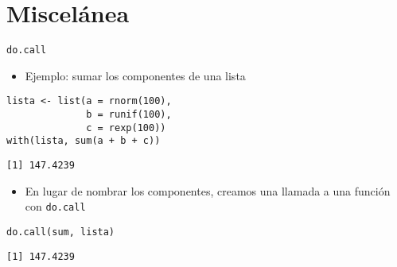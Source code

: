 \documentclass[xcolor={usenames,svgnames,dvipsnames}]{beamer}
\begin{document}
\section{Miscelánea}
\label{sec:orgheadline35}
\begin{frame}[fragile,label={sec:orgheadline30}]{\texttt{do.call}}
 \begin{itemize}
\item Ejemplo: sumar los componentes de una lista
\end{itemize}
\lstset{language=R,label= ,caption= ,captionpos=b,numbers=none}
\begin{lstlisting}
lista <- list(a = rnorm(100),
              b = runif(100),
              c = rexp(100))
with(lista, sum(a + b + c))
\end{lstlisting}

\begin{verbatim}
[1] 147.4239
\end{verbatim}

\begin{itemize}
\item En lugar de nombrar los componentes, creamos una llamada a una
función con \texttt{do.call}
\end{itemize}
\lstset{language=R,label= ,caption= ,captionpos=b,numbers=none}
\begin{lstlisting}
do.call(sum, lista)
\end{lstlisting}

\begin{verbatim}
[1] 147.4239
\end{verbatim}
\end{frame}
\end{document}
